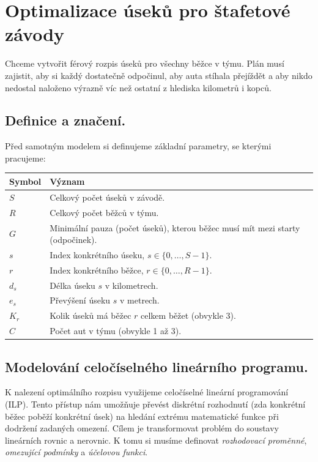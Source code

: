 \documentclass[10pt, a4paper]{article}
\begin{document}
	\section*{Optimalizace úseků pro štafetové závody}

	Chceme vytvořit férový rozpis úseků pro všechny běžce v týmu. Plán musí zajistit, aby si každý dostatečně odpočinul, aby auta stíhala přejíždět a aby nikdo nedostal naloženo výrazně víc než ostatní z hlediska kilometrů i kopců.
	
	\subsection*{Definice a značení.}
	Před samotným modelem si definujeme základní parametry, se kterými pracujeme:
	
	\begin{table}[h]
		\centering
		\begin{tabular}{ll}
			\toprule
			\textbf{Symbol} & \textbf{Význam} \\
			\midrule
			$S$ & Celkový počet úseků v závodě. \\
			$R$ & Celkový počet běžců v týmu. \\
			$G$ & Minimální pauza (počet úseků), kterou běžec musí mít mezi starty (odpočinek). \\
			$s$ & Index konkrétního úseku, $s \in \{0, \dots, S-1\}$. \\
			$r$ & Index konkrétního běžce, $r \in \{0, \dots, R-1\}$. \\
			$d_s$ & Délka úseku $s$ v kilometrech. \\
			$e_s$ & Převýšení úseku $s$ v metrech. \\
			$K_r$ & Kolik úseků má běžec $r$ celkem běžet (obvykle 3). \\
			$C$ & Počet aut v týmu (obvykle 1 až 3). \\
			\bottomrule
		\end{tabular}
	\end{table}
	
	\subsection*{Modelování celočíselného lineárního programu.}
	K nalezení optimálního rozpisu využijeme celočíselné lineární programování (ILP). Tento přístup nám umožňuje převést diskrétní rozhodnutí (zda konkrétní běžec poběží konkrétní úsek) na hledání extrému matematické funkce při dodržení zadaných omezení. Cílem je transformovat problém do soustavy lineárních rovnic a nerovnic. K tomu si musíme definovat \textit{rozhodovací proměnné}, \textit{omezující podmínky} a \textit{účelovou funkci}.
	
\end{document}
